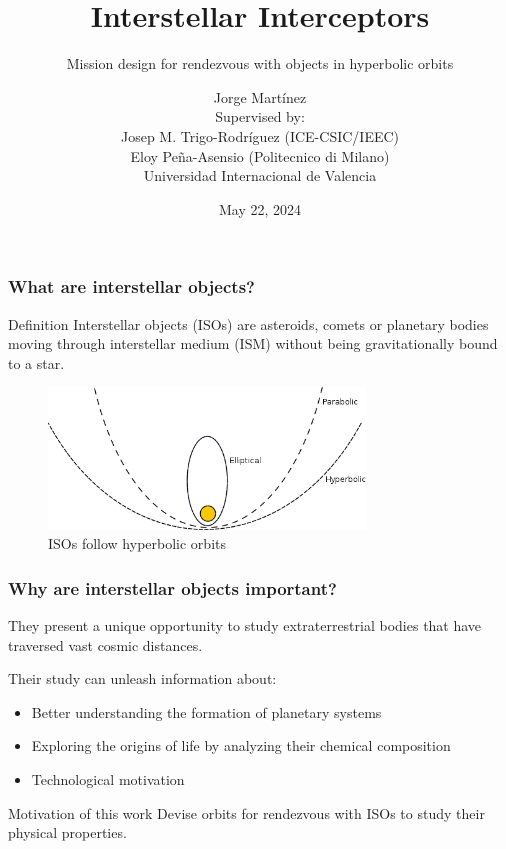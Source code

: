 \documentclass[xcolor={dvipsnames}]{beamer}
\title[About Beamer] %
{Interstellar Interceptors}
\subtitle{Mission design for rendezvous with objects in hyperbolic orbits}
\author[Martínez, Jorge] %
{
    Jorge Martínez\\
    \vspace{1cm}
    Supervised by:\\
    \vspace{0.5cm}
    Josep M. Trigo-Rodríguez (ICE-CSIC/IEEC)\\
    Eloy Peña-Asensio (Politecnico di Milano)\\
    \vspace{0.5cm}
    \footnotesize{Universidad Internacional de Valencia}
}
\date{May 22, 2024}
\begin{document}
\frame{\titlepage}

\begin{frame}
\frametitle{What are interstellar objects?}

\begin{block}{Definition}
    Interstellar objects (ISOs) are asteroids, comets or planetary bodies moving
    through interstellar medium (ISM) without being gravitationally bound to a
    star.
\end{block}

\begin{figure}[h]
    \centering
    \includegraphics[width=0.75\textwidth]{fig/static/orbits.png}
    \caption{ISOs follow hyperbolic orbits}
    \label{fig:example_figure}
\end{figure}

\end{frame}

\begin{frame}
\frametitle{Why are interstellar objects important?}

They present a unique opportunity to study extraterrestrial bodies that have
traversed vast cosmic distances.\\[0.5cm]

\pause

Their study can unleash information about:\\[0.5cm]

\begin{itemize}
    \item Better understanding the formation of planetary systems
    \item Exploring the origins of life by analyzing their chemical composition
    \item Technological motivation
\end{itemize}

\pause

    \vspace{0.5cm}
    \begin{alertblock}{Motivation of this work}
    \vspace{0.2cm}
    Devise orbits for rendezvous with ISOs to study their physical properties.
    \vspace{0.2cm}
\end{alertblock}

\end{frame}
\end{document}
